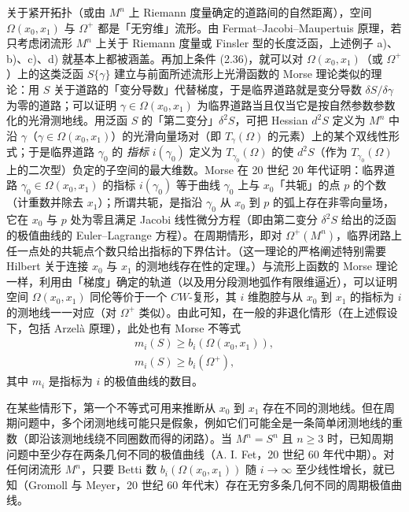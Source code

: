 关于紧开拓扑（或由 $M^n$ 上 Riemann 度量确定的道路间的自然距离），空间 $\Omega(x_0,x_1)$ 与 $\Omega^+$ 都是「无穷维」流形。由 Fermat--Jacobi--Maupertuis 原理，若只考虑闭流形 $M^n$ 上关于 Riemann 度量或 Finsler 型的长度泛函，上述例子 a)、b)、c)、d) 就基本上都被涵盖。再加上条件 (2.36)，就可以对 $\Omega(x_0,x_1)$（或 $\Omega^+$）上的这类泛函 $S\{\gamma\}$ 建立与前面所述流形上光滑函数的 Morse 理论类似的理论：用 $S$ 关于道路的「变分导数」代替梯度，于是临界道路就是变分导数 $\delta S/\delta\gamma$ 为零的道路；可以证明 $\gamma\in\Omega(x_0,x_1)$ 为临界道路当且仅当它是按自然参数参数化的光滑测地线。用泛函 $S$ 的「第二变分」$\delta^2S$，可把 Hessian $d^2S$ 定义为 $M^n$ 中沿 $\gamma$（$\gamma\in\Omega(x_0,x_1)$）的光滑向量场对（即 $T_\gamma(\Omega)$ 的元素）上的某个双线性形式；于是临界道路 $\gamma_0$ 的 \emph{指标} $i(\gamma_0)$ 定义为 $T_{\gamma_0}(\Omega)$ 的使 $d^2S$（作为 $T_{\gamma_0}(\Omega)$ 上的二次型）负定的子空间的最大维数。Morse 在 20 世纪 20 年代证明：临界道路 $\gamma_0\in\Omega(x_0,x_1)$ 的指标 $i(\gamma_0)$ 等于曲线 $\gamma_0$ 上与 $x_0$「共轭」的点 $p$ 的个数（计重数并除去 $x_1$）；所谓共轭，是指沿 $\gamma_0$ 从 $x_0$ 到 $p$ 的弧上存在非零向量场，它在 $x_0$ 与 $p$ 处为零且满足 Jacobi 线性微分方程（即由第二变分 $\delta^2S$ 给出的泛函的极值曲线的 Euler--Lagrange 方程）。在周期情形，即对 $\Omega^+(M^n)$，临界闭路上任一点处的共轭点个数只给出指标的下界估计。（这一理论的严格阐述特别需要 Hilbert 关于连接 $x_0$ 与 $x_1$ 的测地线存在性的定理。）与流形上函数的 Morse 理论一样，利用由「梯度」确定的轨道（以及用分段测地弧作有限维逼近），可以证明空间 $\Omega(x_0,x_1)$ 同伦等价于一个 $CW$-复形，其 $i$ 维胞腔与从 $x_0$ 到 $x_1$ 的指标为 $i$ 的测地线一一对应（对 $\Omega^+$ 类似）。由此可知，在一般的非退化情形（在上述假设下，包括 Arzelà 原理），此处也有 Morse 不等式
\begin{equation}
\begin{gathered}
  m_i(S)\ge b_i(\Omega(x_0,x_1)),\\
  m_i(S)\ge b_i(\Omega^+),
\end{gathered}\tag{2.40}
\end{equation}
其中 $m_i$ 是指标为 $i$ 的极值曲线的数目。

在某些情形下，第一个不等式可用来推断从 $x_0$ 到 $x_1$ 存在不同的测地线。但在周期问题中，多个闭测地线可能只是假象，例如它们可能全是一条简单闭测地线的重数（即沿该测地线绕不同圈数而得的闭路）。当 $M^n=S^n$ 且 $n\ge3$ 时，已知周期问题中至少存在两条几何不同的极值曲线（A. I. Fet，20 世纪 60 年代中期）。对任何闭流形 $M^n$，只要 Betti 数 $b_i(\Omega(x_0,x_1))$ 随 $i\to\infty$ 至少线性增长，就已知（Gromoll 与 Meyer，20 世纪 60 年代末）存在无穷多条几何不同的周期极值曲线。

